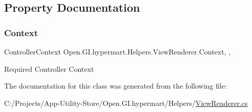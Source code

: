 \subsection{Property Documentation}
\hypertarget{class_open_1_1_g_i_1_1hypermart_1_1_helpers_1_1_view_renderer_ab42d020bf6988c82880809461bfd303b}{}\label{class_open_1_1_g_i_1_1hypermart_1_1_helpers_1_1_view_renderer_ab42d020bf6988c82880809461bfd303b} 
\subsubsection{\texorpdfstring{Context}{Context}}
{\footnotesize\ttfamily Controller\+Context Open.\+G\+I.\+hypermart.\+Helpers.\+View\+Renderer.\+Context\hspace{0.3cm}{\ttfamily [get]}, {\ttfamily [set]}, {\ttfamily [protected]}}



Required Controller Context 



The documentation for this class was generated from the following file\+:\begin{DoxyCompactItemize}
\item 
C\+:/\+Projects/\+App-\/\+Utility-\/\+Store/\+Open.\+G\+I.\+hypermart/\+Helpers/\hyperlink{_view_renderer_8cs}{View\+Renderer.\+cs}\end{DoxyCompactItemize}
